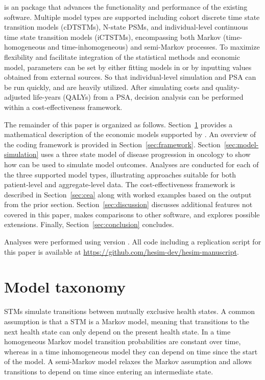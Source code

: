 \documentclass[article, nojss]{jss}\usepackage[]{graphicx}\usepackage[]{color}
\begin{document}
 is an  package that advances the functionality and performance of the existing software. Multiple model types are supported including cohort discrete time state transition models (cDTSTMs), N-state PSMs, and individual-level continuous time state transition models (iCTSTMs), encompassing both Markov (time-homogeneous and time-inhomogeneous) and semi-Markov processes. To maximize flexibility and facilitate integration of the statistical methods and economic model, parameters can be set by either fitting models in  or by inputting values obtained from external sources. So that individual-level simulation and PSA can be run quickly,  and  are heavily utilized. After simulating costs and quality-adjusted life-years (QALYs) from a PSA, decision analysis can be performed within a cost-effectiveness framework.

The remainder of this paper is organized as follows. Section~\ref{sec:model-taxonomy} provides a mathematical description of the economic models supported by . An overview of the coding framework is provided in Section~\ref{sec:framework}. Section~\ref{sec:model-simulation} uses a three state model of disease progression in oncology to show how  can be used to simulate model outcomes. Analyses are conducted for each of the three supported model types, illustrating approaches suitable for both patient-level and aggregate-level data. The cost-effectiveness framework is described in Section~\ref{sec:cea} along with worked examples based on the output from the prior section. Section~\ref{sec:discussion} discusses additional features not covered in this paper, makes comparisons to other software, and explores possible extensions. Finally, Section~\ref{sec:conclusion} concludes. 

Analyses were performed using  version . All code including a replication  script for this paper is available at \url{https://github.com/hesim-dev/hesim-manuscript}.

\section{Model taxonomy} \label{sec:model-taxonomy}
STMs simulate transitions between mutually exclusive health states. A common assumption is that a STM is a Markov model, meaning that transitions to the next health state can only depend on the present health state. In a time homogeneous Markov model transition probabilities are constant over time, whereas in a time inhomogeneous model they can depend on time since the start of the model. A semi-Markov model relaxes the Markov assumption and allows transitions to depend on time since entering an intermediate state.
\end{document}
